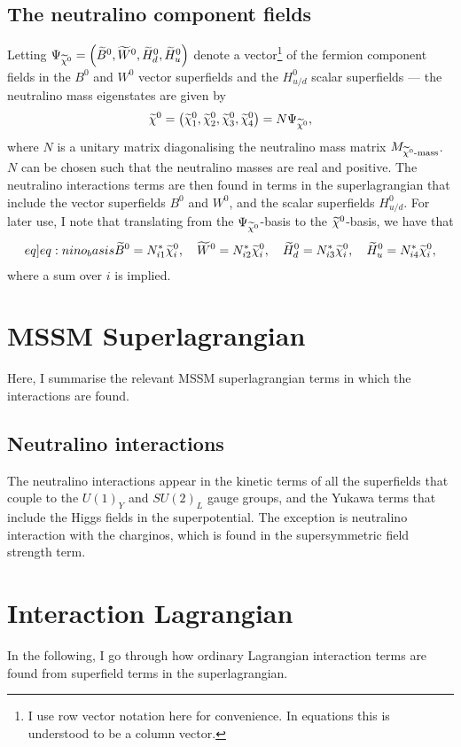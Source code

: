 \documentclass[english, notitlepage]{article}
\begin{document}
\subsection{The neutralino component fields}
Letting \(\Psi_{\nino} = \pclosed{\bino, \wino, \hinod, \hinou}\) denote a
vector\footnote{I use row vector notation here for convenience. In
    equations
    this is understood to be a column vector.} of the fermion component
fields
in
the \(B^0\) and \(W^0\) vector superfields and the \(H^0_{u/d}\) scalar
superfields
--- the neutralino mass eigenstates are given by
\begin{align}
    \nino = \pclosed{\nino[1], \nino[2], \nino[3], \nino[4]} = N
    \Psi_{\nino},
\end{align}
where \(N\) is a unitary matrix diagonalising the neutralino mass matrix
\(M_{\nino\text{-mass}}\).
\(N\) can be chosen such that the neutralino masses are real and positive.
The neutralino interactions terms are then found in terms in the
superlagrangian that include the vector superfields \(B^0\) and \(W^0\),
and
the
scalar superfields \(H^0_{u/d}\).
For later use, I note that translating from the \(\Psi_{\nino}\)-basis to
the
\(\nino\)-basis, we have that
\begin{align}
    \label[eq]{eq:nino_basis}
    \bino = N_{i1}^\ast \nino[i],\quad \wino = N_{i2}^\ast \nino[i],\quad
    \hinod = N_{i3}^\ast \nino[i],\quad \hinou = N_{i4}^\ast \nino[i],
\end{align}
where a sum over \(i\) is implied.

\section{MSSM Superlagrangian}
Here, I summarise the relevant MSSM superlagrangian terms in which the
interactions are found.
\subsection{Neutralino interactions}
The neutralino interactions appear in the kinetic terms of all the
superfields
that couple to the \(U(1)_Y\) and \(SU(2)_L\) gauge groups, and the Yukawa
terms
that include the Higgs fields in the superpotential. The exception is
neutralino interaction with the charginos, which is found in the
supersymmetric
field strength term.

\section{Interaction Lagrangian}
In the following, I go through how ordinary Lagrangian interaction terms
are
found from superfield terms in the superlagrangian.
\end{document}
